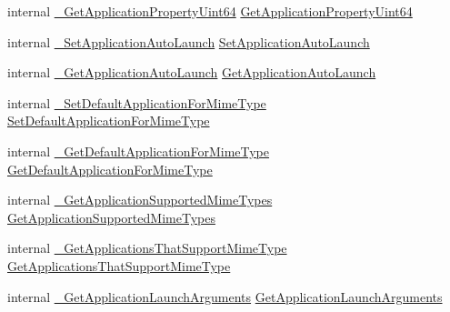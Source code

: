 \begin{DoxyCompactItemize}
internal \mbox{\hyperlink{struct_valve_1_1_v_r_1_1_i_v_r_applications_ac05c82e30b4622cc0e53e7ab75688677}{\+\_\+\+Get\+Application\+Property\+Uint64}} \mbox{\hyperlink{struct_valve_1_1_v_r_1_1_i_v_r_applications_a2b6a2bd196e2f98f585775e8cf01ee96}{Get\+Application\+Property\+Uint64}}
\item 
internal \mbox{\hyperlink{struct_valve_1_1_v_r_1_1_i_v_r_applications_acc22946329e6d33fc826a928d1087dfc}{\+\_\+\+Set\+Application\+Auto\+Launch}} \mbox{\hyperlink{struct_valve_1_1_v_r_1_1_i_v_r_applications_a28401a95a7de5943fff6474b1435ada3}{Set\+Application\+Auto\+Launch}}
\item 
internal \mbox{\hyperlink{struct_valve_1_1_v_r_1_1_i_v_r_applications_ae7b3dd42def4887d70c2856b79679c8a}{\+\_\+\+Get\+Application\+Auto\+Launch}} \mbox{\hyperlink{struct_valve_1_1_v_r_1_1_i_v_r_applications_a5e0fb4c7d3b8861efcbe184994c22ed1}{Get\+Application\+Auto\+Launch}}
\item 
internal \mbox{\hyperlink{struct_valve_1_1_v_r_1_1_i_v_r_applications_aa326d8a6ab208fa726df73e9b0fd9351}{\+\_\+\+Set\+Default\+Application\+For\+Mime\+Type}} \mbox{\hyperlink{struct_valve_1_1_v_r_1_1_i_v_r_applications_add339ed75c0ec865019a696d0d1b6d4b}{Set\+Default\+Application\+For\+Mime\+Type}}
\item 
internal \mbox{\hyperlink{struct_valve_1_1_v_r_1_1_i_v_r_applications_ab4fbef52ef861cd328df9296e83073b5}{\+\_\+\+Get\+Default\+Application\+For\+Mime\+Type}} \mbox{\hyperlink{struct_valve_1_1_v_r_1_1_i_v_r_applications_a5f20bbebe2e64d0708ab71b157bc1823}{Get\+Default\+Application\+For\+Mime\+Type}}
\item 
internal \mbox{\hyperlink{struct_valve_1_1_v_r_1_1_i_v_r_applications_a0c1a0f078e0bd30ada05dccc30aaa3b9}{\+\_\+\+Get\+Application\+Supported\+Mime\+Types}} \mbox{\hyperlink{struct_valve_1_1_v_r_1_1_i_v_r_applications_ae283807d74221cb190c96b05508ad842}{Get\+Application\+Supported\+Mime\+Types}}
\item 
internal \mbox{\hyperlink{struct_valve_1_1_v_r_1_1_i_v_r_applications_a69203996ca75bee54e6ff4b68d774618}{\+\_\+\+Get\+Applications\+That\+Support\+Mime\+Type}} \mbox{\hyperlink{struct_valve_1_1_v_r_1_1_i_v_r_applications_adb1c22d761558e6fee174e6ee23da4df}{Get\+Applications\+That\+Support\+Mime\+Type}}
\item 
internal \mbox{\hyperlink{struct_valve_1_1_v_r_1_1_i_v_r_applications_ad9370206e2fdcbc78913aa7e21ec53fa}{\+\_\+\+Get\+Application\+Launch\+Arguments}} \mbox{\hyperlink{struct_valve_1_1_v_r_1_1_i_v_r_applications_a5e26851d3d3db6c0318c03533c9c78f6}{Get\+Application\+Launch\+Arguments}}

\end{DoxyCompactItemize}
